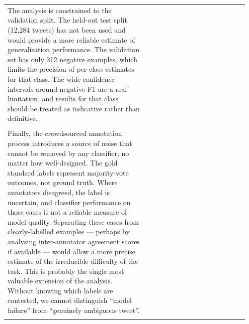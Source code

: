 \documentclass[11pt]{article}
\begin{document}
\begin{longtable}{|p{0.55\linewidth}|p{0.40\linewidth}|}
\hline
\rule{0pt}{3.5cm} & \\
\hline
The analysis is constrained to the validation split. The held-out test split (12,284 tweets) has not been used and would provide a more reliable estimate of generalisation performance. The validation set has only 312 negative examples, which limits the precision of per-class estimates for that class. The wide confidence intervals around negative F1 are a real limitation, and results for that class should be treated as indicative rather than definitive. & \\[2pt]
\hline
\rule{0pt}{3.5cm} & \\
\hline
Finally, the crowdsourced annotation process introduces a source of noise that cannot be removed by any classifier, no matter how well-designed. The gold standard labels represent majority-vote outcomes, not ground truth. Where annotators disagreed, the label is uncertain, and classifier performance on those cases is not a reliable measure of model quality. Separating these cases from clearly-labelled examples --- perhaps by analysing inter-annotator agreement scores if available --- would allow a more precise estimate of the irreducible difficulty of the task. This is probably the single most valuable extension of the analysis. Without knowing which labels are contested, we cannot distinguish ``model failure'' from ``genuinely ambiguous tweet''. & \\[2pt]
\hline
\rule{0pt}{3.5cm} & \\
\hline
\end{longtable}
\end{document}
